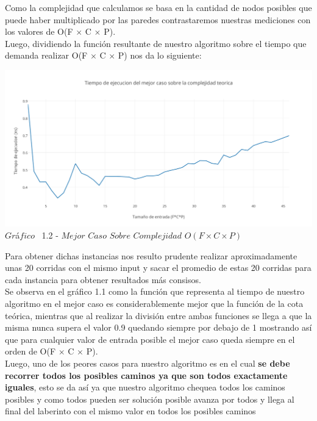 Como la complejidad que calculamos se basa en la cantidad de nodos posibles que puede haber multiplicado por las paredes contrastaremos nuestras mediciones con los valores de O(F $\times$ C $\times$ P).\\

Luego, dividiendo la funci\'on resultante de nuestro algoritmo sobre el tiempo que demanda realizar O(F $\times$ C $\times$ P) nos da lo siguiente:

\vspace*{0.3cm} \vspace*{0.3cm}
  \begin{center}
 \includegraphics[scale=0.65]{./EJ1/mejorcaso1.png}
 {$Gr$\'a$fico$ \ 1.2 - $Mejor$ $Caso$ $Sobre$ $Complejidad$ $O(F \times C \times P)$}
  \end{center}
  \vspace*{0.3cm}

 Para obtener dichas instancias nos resulto prudente realizar aproximadamente unas 20 corridas con el mismo input y sacar el promedio de estas 20 corridas para cada instancia para obtener resultados m\'as consisos.\\ 

Se observa en el gr\'afico 1.1 como la funci\'on que representa al tiempo de nuestro algoritmo en el mejor caso es considerablemente mejor que la funci\'on de la cota te\'orica, mientras que al realizar la divisi\'on entre ambas funciones se llega a que la misma nunca supera el valor 0.9 quedando siempre por debajo de 1 mostrando as\'i que para cualquier valor de entrada posible el mejor caso queda siempre en el orden de  O(F $\times$ C $\times$ P).\\

Luego, uno de los peores casos para nuestro algoritmo es en el cual  \textbf{se debe recorrer todos los posibles caminos ya que son todos exactamente iguales}, esto se da as\'i ya que nuestro algoritmo chequea todos los caminos posibles y como todos pueden ser soluci\'on posible avanza por todos y llega al final del laberinto con el mismo valor en todos los posibles caminos\\

